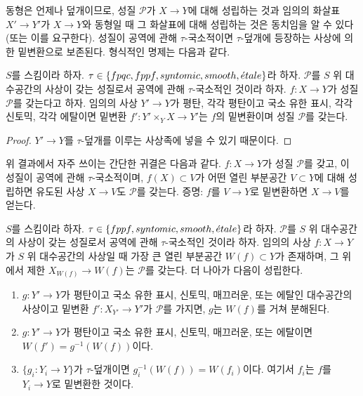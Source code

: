 \noindent
동형은 언제나 덮개이므로, 성질 $\mathcal{P}$가 $X\to Y$에 대해
성립하는 것과 임의의 화살표 $X'\to Y'$가 $X\to Y$와 동형일 때 그
화살표에 대해 성립하는 것은 동치임을 알 수 있다(또는 이를 요구한다). 성질이 공역에
관해 $\tau$-국소적이면 $\tau$-덮개에 등장하는 사상에 의한 밑변환으로
보존된다. 형식적인 명제는 다음과 같다.

\begin{lemma}
\label{lemma-pullback-property-local-target}
$S$를 스킴이라 하자. $\tau\in\{fpqc,fppf,syntomic,smooth,{\acute{e}tale}\}$라
하자. $\mathcal{P}$를 $S$ 위 대수공간의 사상이 갖는 성질로서 공역에
관해 $\tau$-국소적인 것이라 하자. $f:X\to Y$가 성질 $\mathcal{P}$를
갖는다고 하자. 임의의 사상 $Y'\to Y$가 평탄, 각각 평탄이고 국소 유한
표시, 각각 신토믹, 각각 에탈이면 밑변환
$f':Y'\times_YX\to Y'$는 $f$의 밑변환이며 성질 $\mathcal{P}$를 갖는다.
\end{lemma}

\begin{proof}
$Y'\to Y$를 $\tau$-덮개를 이루는 사상족에 넣을 수 있기 때문이다.
\end{proof}

\noindent
위 결과에서 자주 쓰이는 간단한 귀결은 다음과 같다.
$f:X\to Y$가 성질 $\mathcal{P}$를 갖고, 이 성질이 공역에 관해
$\tau$-국소적이며, $f(X)\subset V$가 어떤 열린 부분공간
$V\subset Y$에 대해 성립하면 유도된
사상 $X\to V$도 $\mathcal{P}$를 갖는다. 증명: $f$를 $V\to Y$로
밑변환하면 $X\to V$를 얻는다.

\begin{lemma}
\label{lemma-largest-open-of-the-base}
$S$를 스킴이라 하자. $\tau\in\{fppf,syntomic,smooth,{\acute{e}tale}\}$라 하자.
$\mathcal{P}$를 $S$ 위 대수공간의 사상이 갖는 성질로서 공역에 관해
$\tau$-국소적인 것이라 하자. 임의의 사상 $f:X\to Y$가 $S$ 위
대수공간의 사상일 때 가장 큰 열린 부분공간 $W(f)\subset Y$가 존재하며,
그 위에서 제한 $X_{W(f)}\to W(f)$는 $\mathcal{P}$를 갖는다. 더 나아가
다음이 성립한다.
\begin{enumerate}
\item $g:Y'\to Y$가 평탄이고 국소 유한 표시, 신토믹, 매끄러운, 또는
에탈인 대수공간의 사상이고 밑변환 $f':X_{Y'}\to Y'$가
$\mathcal{P}$를 가지면, $g$는 $W(f)$를 거쳐 분해된다.
\item $g:Y'\to Y$가 평탄이고 국소 유한 표시, 신토믹, 매끄러운, 또는
에탈이면 $W(f')=g^{-1}(W(f))$이다.
\item $\{g_i:Y_i\to Y\}$가 $\tau$-덮개이면
$g_i^{-1}(W(f))=W(f_i)$이다. 여기서 $f_i$는 $f$를 $Y_i\to Y$로
밑변환한 것이다.
\end{enumerate}
\end{lemma}

